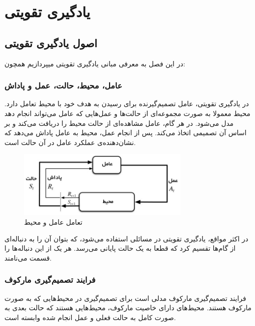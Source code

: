 \chapter{ یادگیری تقویتی}
\section{اصول یادگیری تقویتی}
در این فصل به معرفی مبانی یادگیری تقویتی میپردازیم همچون:
\subsection{عامل، محیط، حالت، عمل و پاداش}
در یادگیری تقویتی، عامل 
 تصمیم‌گیرنده برای رسیدن به هدف خود با محیط
  تعامل دارد.
محیط معمولا به صورت مجموعه‌ای از حالت‌ها 
  و عمل‌هایی 
    که عامل می‌تواند انجام دهد مدل می‌شود.
در هر گام، عامل مشاهده‌ای از حالت محیط را دریافت می‌کند و بر اساس آن تصمیمی اتخاذ می‌کند.
پس از انجام عمل، محیط به عامل پاداش 
  می‌دهد که نشان‌دهنده‌ی عملکرد عامل در آن حالت است.

\begin{figure}[H]
    \centering
    \includegraphics[width=0.75\textwidth]{images/agent_env.jpg}
    \caption{تعامل عامل و محیط}\label{fig:agent_env}

\end{figure}
در اکثر مواقع، یادگیری تقویتی در مسائلی استفاده می‌شود، که بتوان آن را به دنباله‌ای از گام‌ها تقسیم کرد که قطعا به یک حالت پایانی می‌رسد.
 هر یک از این دنباله‌ها را قسمت 
  می‌نامند.
\subsection{فرایند تصمیم‌گیری مارکوف}
فرایند تصمیم‌گیری مارکوف 
  مدلی است برای تصمیم‌گیری در محیط‌هایی که به صورت مارکوف هستند.
  محیط‌های دارای خاصیت مارکوف، محیط‌هایی هستند که حالت بعدی به صورت کامل به حالت فعلی و عمل انجام شده وابسته است.


